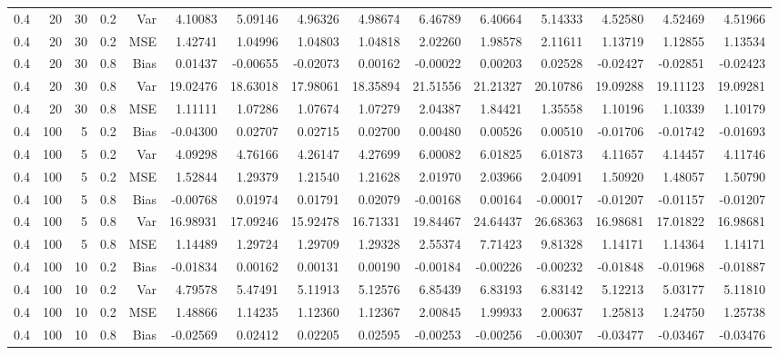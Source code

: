 \begin{table}[!htbp]
\begin{tabular}{lrrrrrrrrrrrrrr}
0.4 &  20 & 30 & 0.2 & Var & 4.10083 & 5.09146 & 4.96326 & 4.98674 & 6.46789 & 6.40664 & 5.14333 & 4.52580 & 4.52469 & 4.51966 \\
0.4 &  20 & 30 & 0.2 & MSE & 1.42741 & 1.04996 & 1.04803 & 1.04818 & 2.02260 & 1.98578 & 2.11611 & 1.13719 & 1.12855 & 1.13534 \\
0.4 &  20 & 30 & 0.8 & Bias & 0.01437 & -0.00655 & -0.02073 & 0.00162 & -0.00022 & 0.00203 & 0.02528 & -0.02427 & -0.02851 & -0.02423 \\
0.4 &  20 & 30 & 0.8 & Var & 19.02476 & 18.63018 & 17.98061 & 18.35894 & 21.51556 & 21.21327 & 20.10786 & 19.09288 & 19.11123 & 19.09281 \\
0.4 &  20 & 30 & 0.8 & MSE & 1.11111 & 1.07286 & 1.07674 & 1.07279 & 2.04387 & 1.84421 & 1.35558 & 1.10196 & 1.10339 & 1.10179 \\
0.4 & 100 &  5 & 0.2 & Bias & -0.04300 & 0.02707 & 0.02715 & 0.02700 & 0.00480 & 0.00526 & 0.00510 & -0.01706 & -0.01742 & -0.01693 \\
0.4 & 100 &  5 & 0.2 & Var & 4.09298 & 4.76166 & 4.26147 & 4.27699 & 6.00082 & 6.01825 & 6.01873 & 4.11657 & 4.14457 & 4.11746 \\
0.4 & 100 &  5 & 0.2 & MSE & 1.52844 & 1.29379 & 1.21540 & 1.21628 & 2.01970 & 2.03966 & 2.04091 & 1.50920 & 1.48057 & 1.50790 \\
0.4 & 100 &  5 & 0.8 & Bias & -0.00768 & 0.01974 & 0.01791 & 0.02079 & -0.00168 & 0.00164 & -0.00017 & -0.01207 & -0.01157 & -0.01207 \\
0.4 & 100 &  5 & 0.8 & Var & 16.98931 & 17.09246 & 15.92478 & 16.71331 & 19.84467 & 24.64437 & 26.68363 & 16.98681 & 17.01822 & 16.98681 \\
0.4 & 100 &  5 & 0.8 & MSE & 1.14489 & 1.29724 & 1.29709 & 1.29328 & 2.55374 & 7.71423 & 9.81328 & 1.14171 & 1.14364 & 1.14171 \\
0.4 & 100 & 10 & 0.2 & Bias & -0.01834 & 0.00162 & 0.00131 & 0.00190 & -0.00184 & -0.00226 & -0.00232 & -0.01848 & -0.01968 & -0.01887 \\
0.4 & 100 & 10 & 0.2 & Var & 4.79578 & 5.47491 & 5.11913 & 5.12576 & 6.85439 & 6.83193 & 6.83142 & 5.12213 & 5.03177 & 5.11810 \\
0.4 & 100 & 10 & 0.2 & MSE & 1.48866 & 1.14235 & 1.12360 & 1.12367 & 2.00845 & 1.99933 & 2.00637 & 1.25813 & 1.24750 & 1.25738 \\
0.4 & 100 & 10 & 0.8 & Bias & -0.02569 & 0.02412 & 0.02205 & 0.02595 & -0.00253 & -0.00256 & -0.00307 & -0.03477 & -0.03467 & -0.03476 \\

\end{tabular}
\end{table}
